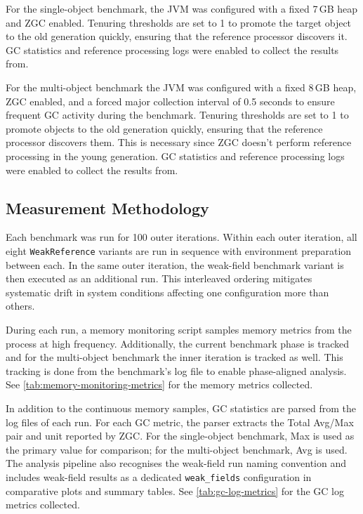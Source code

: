 For the single-object benchmark, the JVM was configured with a fixed 7\,GB heap and ZGC enabled. Tenuring thresholds are set to 1 to promote the target object to the old generation quickly, ensuring that the reference processor discovers it. GC statistics and reference processing logs were enabled to collect the results from.

For the multi-object benchmark the JVM was configured with a fixed 8\,GB heap, ZGC enabled, and a forced major collection interval of 0.5 seconds to ensure frequent GC activity during the benchmark. Tenuring thresholds are set to 1 to promote objects to the old generation quickly, ensuring that the reference processor discovers them. This is necessary since ZGC doesn't perform reference processing in the young generation. GC statistics and reference processing logs were enabled to collect the results from.

\subsection{Measurement Methodology}
\label{subsec:measurement-methodology}

Each benchmark was run for 100 outer iterations. Within each outer iteration, all eight \texttt{WeakReference} variants are run in sequence with environment preparation between each. In the same outer iteration, the weak-field benchmark variant is then executed as an additional run. This interleaved ordering mitigates systematic drift in system conditions affecting one configuration more than others.

During each run, a memory monitoring script samples memory metrics from the process at high frequency. Additionally, the current benchmark phase is tracked and for the multi-object benchmark the inner iteration is tracked as well. This tracking is done from the benchmark's log file to enable phase-aligned analysis. See \cref{tab:memory-monitoring-metrics} for the memory metrics collected.

In addition to the continuous memory samples, GC statistics are parsed from the log files of each run. For each GC metric, the parser extracts the Total Avg/Max pair and unit reported by ZGC. For the single-object benchmark, Max is used as the primary value for comparison; for the multi-object benchmark, Avg is used. The analysis pipeline also recognises the weak-field run naming convention and includes weak-field results as a dedicated \texttt{weak\_fields} configuration in comparative plots and summary tables. See \cref{tab:gc-log-metrics} for the GC log metrics collected.

